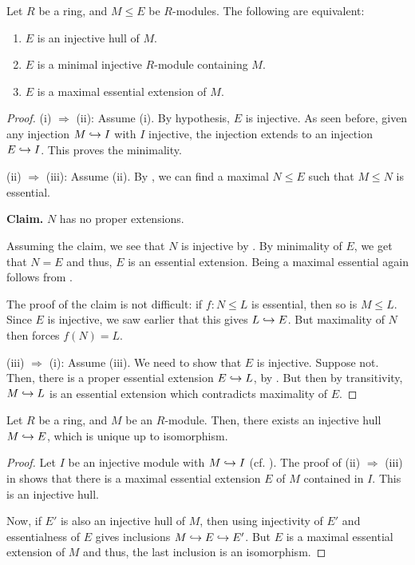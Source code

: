 \begin{thm} \label{thm:injective-hull-equivalent}
	Let $R$ be a ring, and $M \le E$ be $R$-modules. The following are equivalent:
	\begin{enumerate}[label=(\roman*)]
		\item $E$ is an injective hull of $M$.
		\item $E$ is a minimal injective $R$-module containing $M$.
		\item $E$ is a maximal essential extension of $M$.
	\end{enumerate}
\end{thm}
\begin{proof} 
	(i) $\Rightarrow$ (ii): Assume (i). By hypothesis, $E$ is injective. As seen before, given any injection $M \hookrightarrow I$ with $I$ injective, the injection extends to an injection $E \hookrightarrow I$. This proves the minimality.

	(ii) $\Rightarrow$ (iii): Assume (ii). By , we can find a maximal $N \le E$ such that $M \le N$ is essential. 

	\textbf{Claim.} $N$ has no proper extensions.

	Assuming the claim, we see that $N$ is injective by . By minimality of $E$, we get that $N = E$ and thus, $E$ is an essential extension. Being a maximal essential again follows from .

	The proof of the claim is not difficult: if $f : N \le L$ is essential, then so is $M \le L$. Since $E$ is injective, we saw earlier that this gives $L \hookrightarrow E$. But maximality of $N$ then forces $f(N) = L$.

	(iii) $\Rightarrow$ (i): Assume (iii). We need to show that $E$ is injective. Suppose not. Then, there is a proper essential extension $E \hookrightarrow L$, by . But then by transitivity, $M \hookrightarrow L$ is an essential extension which contradicts maximality of $E$.
\end{proof}

\begin{thm}
	Let $R$ be a ring, and $M$ be an $R$-module. Then, there exists an injective hull $M \hookrightarrow E$, which is unique up to isomorphism.
\end{thm}
\begin{proof} 
	Let $I$ be an injective module with $M \hookrightarrow I$ (cf. ). The proof of (ii) $\Rightarrow$ (iii) in  shows that there is a maximal essential extension $E$ of $M$ contained in $I$. This is an injective hull.

	Now, if $E'$ is also an injective hull of $M$, then using injectivity of $E'$ and essentialness of $E$ gives inclusions $M \hookrightarrow E \hookrightarrow E'$. But $E$ is a maximal essential extension of $M$ and thus, the last inclusion is an isomorphism.
\end{proof}

